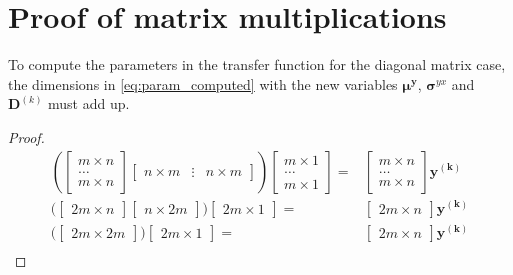 \chapter{Proof of matrix multiplications} %
\label{cha:proof_of_matrix_multiplication}
To compute the parameters in the transfer function for the diagonal matrix case, the dimensions in \eqref{eq:param_computed} with the new variables $\boldsymbol{\mu^y}$, $\boldsymbol{\sigma}^{yx}$ and $\mathbf{D}^{(k)}$ must add up.
\begin{proof}
\begin{equation*}
	\begin{split}
		\left(  
	\begin{bmatrix}
		m \times n \\
		\dots \\
		m \times n
	\end{bmatrix}
	\begin{bmatrix}
		n \times m & \vdots & n\times m
	\end{bmatrix} \right)
	\begin{bmatrix}
		m \times 1 \\
		\dots \\
		m \times 1 
	\end{bmatrix}
	= & 
	\begin{bmatrix}
		m \times n \\
		\dots \\
		m \times n
	\end{bmatrix} \mathbf{y^{(k)}}\\ 	%
	\biggl( \begin{bmatrix}
		2m \times n 
	\end{bmatrix}
	\begin{bmatrix}
		n \times 2m
	\end{bmatrix} \biggr) 
	\begin{bmatrix}
		2m \times 1
	\end{bmatrix}
	= & 
	\begin{bmatrix}
		2m \times n
	\end{bmatrix} \mathbf{y^{(k)}} \\ 	%
	\biggl( \begin{bmatrix}
		2m \times  2m
	\end{bmatrix} \biggr) 
	\begin{bmatrix}
		2m \times 1 
	\end{bmatrix}
	= &
	\begin{bmatrix}
		2m \times n 
	\end{bmatrix} \mathbf{y^{(k)}} \\ 	%

\end{split}
\end{equation*}
\end{proof}
